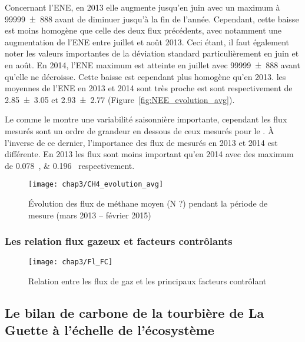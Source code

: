 Concernant l'ENE, en 2013 elle augmente jusqu'en juin avec un maximum à \SI{99999(888)}{\uml} avant de diminuer jusqu'à la fin de l'année.
Cependant, cette baisse est moins homogène que celle des deux flux précédents, avec notamment une augmentation de l'ENE entre juillet et août 2013.
Ceci étant, il faut également noter les valeurs importantes de la déviation standard particulièrement en juin et en août.
En 2014, l'ENE maximum est atteinte en juillet avec \SI{99999(888)}{\uml} avant qu'elle ne décroisse.
Cette baisse est cependant plus homogène qu'en 2013.
les moyennes de l'ENE en 2013 et 2014 sont très proche est sont respectivement de \SI{2.85(305)}{\uml} et \SI{2.93(277)}{\uml} (Figure~\ref{fig:NEE_evolution_avg}).


Le \chh comme le \coo montre une variabilité saisonnière importante, cependant les flux mesurés sont un ordre de grandeur en dessous de ceux mesurés pour le \coo.
À l'inverse de ce dernier, l'importance des flux de \chh mesurés en 2013 et 2014 est différente.
En 2013 les flux sont moins important qu'en 2014 avec des maximum de \SIlist{0.078;0.196}{\uml} respectivement.

\begin{figure}
\centering
\texttt{[image: chap3/CH4\_evolution\_avg]}
\caption{Évolution des flux de méthane moyen (N ?) pendant la période de mesure (mars 2013 -- février 2015)}
\label{fig:CH4_evolution_avg}
\end{figure}


\subsubsection{Les relation flux gazeux et facteurs contrôlants}

\begin{figure}
\centering
\texttt{[image: chap3/Fl\_FC]}
\caption{Relation entre les flux de gaz et les principaux facteurs contrôlant}
\label{fig:Fl_FC}
\end{figure}

\subsection{Le bilan de carbone de la tourbière de La Guette à l'échelle de l'écosystème}

